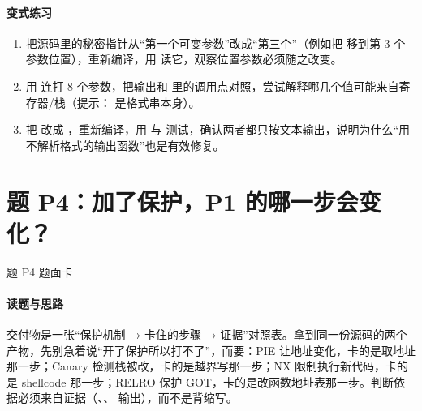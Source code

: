 \documentclass[UTF8,12pt,oneside]{ctexbook}
\begin{document}
\paragraph{变式练习}
\begin{enumerate}
\item 把源码里的秘密指针从“第一个可变参数”改成“第三个”（例如把  移到第 3 个参数位置），重新编译，用  读它，观察位置参数必须随之改变。
\item 用  连打 8 个参数，把输出和  里的调用点对照，尝试解释哪几个值可能来自寄存器/栈（提示： 是格式串本身）。
\item 把  改成 ，重新编译，用  与  测试，确认两者都只按文本输出，说明为什么“用不解析格式的输出函数”也是有效修复。
\end{enumerate}

\section{题 P4：加了保护，P1 的哪一步会变化？}

\begin{challenge}{题 P4 题面卡}
\end{challenge}

\paragraph{读题与思路}交付物是一张“保护机制 → 卡住的步骤 → 证据”对照表。拿到同一份源码的两个产物，先别急着说“开了保护所以打不了”，而要：PIE 让地址变化，卡的是取地址那一步；Canary 检测栈被改，卡的是越界写那一步；NX 限制执行新代码，卡的是 shellcode 那一步；RELRO 保护 GOT，卡的是改函数地址表那一步。判断依据必须来自证据（、、 输出），而不是背缩写。
\end{document}
